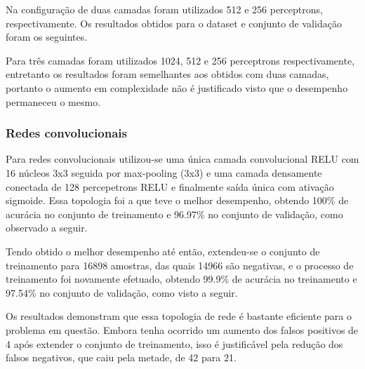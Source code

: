 Na configuração de duas camadas foram utilizados 512 e 256 perceptrons, respectivamente. Os resultados obtidos para o dataset e conjunto de validação foram os seguintes.
\begin{table}[h!]

\end{table}

Para três camadas foram utilizados 1024, 512 e 256 perceptrons respectivamente, entretanto os resultados foram semelhantes aos obtidos com duas camadas, portanto o aumento em complexidade não é justificado visto que o desempenho permaneceu o mesmo.

\subsubsection{Redes convolucionais}
Para redes convolucionais utilizou-se uma única camada convolucional RELU com 16 núcleos 3x3 seguida por max-pooling (3x3) e uma camada densamente conectada de 128 percepetrons RELU e finalmente saída única com ativação sigmoide. Essa topologia foi a que teve o melhor desempenho, obtendo 100\% de acurácia no conjunto de treinamento e 96.97\% no conjunto de validação, como observado a seguir.

\begin{table}[h!]
\end{table}

Tendo obtido o melhor desempenho até então, extendeu-se o conjunto de treinamento para 16898 amostras, das quais 14966 são negativas, e o processo de treinamento foi novamente efetuado, obtendo 99.9\% de acurácia no treinamento e 97.54\% no conjunto de validação, como visto a seguir.

\begin{table}[h!]
\end{table}

Os resultados demonstram que essa topologia de rede é bastante eficiente para o problema em questão. Embora tenha ocorrido um aumento dos falsos positivos de 4 após extender o conjunto de treinamento, isso é justificável pela redução dos falsos negativos, que caiu pela metade, de 42 para 21.

